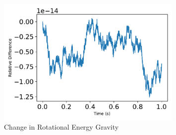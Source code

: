 \begin{figure}[htbp]\centerline{\includegraphics[width=0.8\textwidth]{AutoTeX/ChangeInRotationalEnergyGravity}}\caption{Change in Rotational Energy Gravity}\label{fig:ChangeInRotationalEnergyGravity}\end{figure}